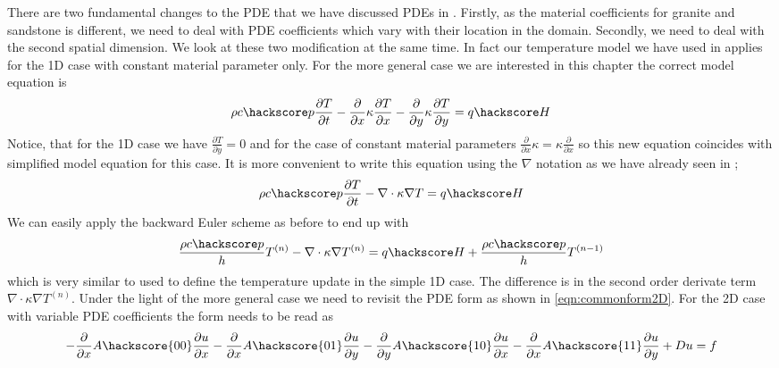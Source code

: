 There are two fundamental changes to the PDE that we have discussed PDEs in . Firstly,
as the material coefficients for granite and sandstone is different, we need to deal with 
PDE coefficients which vary with their location in the domain. Secondly, we need 
to deal with the second spatial dimension. We look at these two modification at the same time. 
In fact our temperature model  we have used in  applies for the 
1D case with constant material parameter only. For the more general case we are interested 
in this chapter the correct model equation is 
\begin{equation}
\rho c\hackscore p \frac{\partial T}{\partial t} -  \frac{\partial }{\partial x} \kappa \frac{\partial T}{\partial x} -  \frac{\partial }{\partial y} \kappa \frac{\partial T}{\partial y} = q\hackscore H 
\label{eqn:hd2}
\end{equation}
Notice, that for the 1D case we have $\frac{\partial T}{\partial y}=0$ and
for the case of constant material parameters $\frac{\partial }{\partial x} \kappa = \kappa  \frac{\partial }{\partial x}$ so this new equation coincides with simplified model equation for this case. It is more convenient 
to write this equation using the $\nabla$ notation as we have already seen in ;
\begin{equation}\label{eqn:Tform nabla}
\rho c\hackscore p \frac{\partial T}{\partial t} 
-\nabla \cdot \kappa \nabla T = q\hackscore H
\end{equation}
We can easily apply the backward Euler scheme as before to end up with 
\begin{equation}
\frac{\rho c\hackscore p}{h} T^{(n)} -\nabla \cdot \kappa \nabla T^{(n)}  = q\hackscore H +  \frac{\rho c\hackscore p}{h} T^{(n-1)}
\label{eqn:hdgenf2}
\end{equation}
which is very similar to  used to define the temperature update in the simple 1D case. 
The difference is in the second order derivate term $\nabla \cdot \kappa \nabla T^{(n)}$. Under 
the light of the more general case we need to revisit the \esc PDE form as 
shown in \ref{eqn:commonform2D}. For the 2D case with variable PDE coefficients 
the form needs to be read as 
\begin{equation}\label{eqn:commonform2D 2}
-\frac{\partial }{\partial x} A\hackscore{00}\frac{\partial u}{\partial x} 
-\frac{\partial }{\partial x} A\hackscore{01}\frac{\partial u}{\partial y} 
-\frac{\partial }{\partial y} A\hackscore{10}\frac{\partial u}{\partial x} 
-\frac{\partial }{\partial x} A\hackscore{11}\frac{\partial u}{\partial y} 
+ Du = f
\end{equation}

